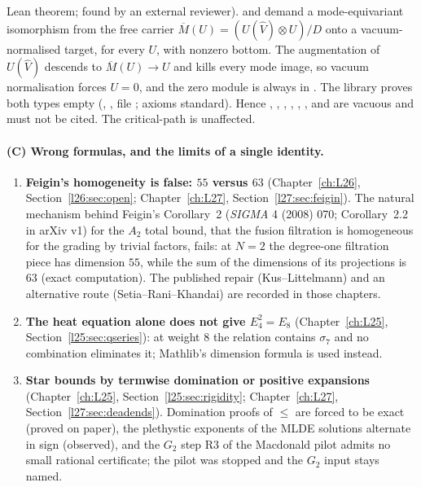\begin{enumerate}
  Lean theorem; found by an external reviewer).  and  demand
  a mode-equivariant isomorphism from the free carrier $\overline M(U)=(U(\hat V)\otimes U)/D$ onto a vacuum-normalised target, for
  every $U$, with nonzero bottom. The augmentation of $U(\hat V)$ descends to $\overline M(U)\to U$ and kills every mode image, so
  vacuum normalisation forces $U=0$, and the zero module is always in . The library proves both types empty
  (, , file
  ; axioms standard). Hence
  , , , ,
  , ,  and
   are vacuous and must not be cited. The critical-path  is unaffected.
\end{enumerate}

\paragraph{(C) Wrong formulas, and the limits of a single identity.}
\begin{enumerate}
\item \textbf{Feigin's homogeneity is false: $55$ versus $63$} (Chapter~\ref{ch:L26}, Section~\ref{l26:sec:open};
  Chapter~\ref{ch:L27}, Section~\ref{l27:sec:feigin}). The natural mechanism behind Feigin's Corollary~2 (\emph{SIGMA} 4 (2008) 070; Corollary~2.2 in arXiv v1) for the $A_2$
  total bound, that the fusion filtration is homogeneous for the grading by trivial factors, fails: at $N=2$ the degree-one
  filtration piece has dimension $55$, while the sum of the dimensions of its projections is $63$ (exact computation).
  The published repair (Kus--Littelmann) and an alternative route (Setia--Rani--Khandai) are recorded in those chapters.
\item \textbf{The heat equation alone does not give $E_4^2=E_8$} (Chapter~\ref{ch:L25}, Section~\ref{l25:sec:qseries}):
  at weight $8$ the relation contains $\sigma_7$ and no combination eliminates it; Mathlib's dimension formula is used
  instead.
\item \textbf{Star bounds by termwise domination or positive expansions} (Chapter~\ref{ch:L25},
  Section~\ref{l25:sec:rigidity}; Chapter~\ref{ch:L27}, Section~\ref{l27:sec:deadends}). Domination proofs of $\le$ are
  forced to be exact (proved on paper), the plethystic exponents of the MLDE solutions alternate in sign (observed), and
  the $G_2$ step R3 of the Macdonald pilot admits no small rational certificate; the pilot was stopped and the $G_2$ input
  stays named.
\end{enumerate}

